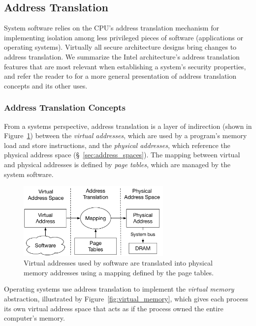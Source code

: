 \subsection{Address Translation}
\label{sec:paging}


System software relies on the CPU's address translation mechanism for
implementing isolation among less privileged pieces of software (applications
or operating systems). Virtually all secure architecture designs bring changes
to address translation. We summarize the Intel architecture's address
translation features that are most relevant when establishing a system's
security properties, and refer the reader to \cite{jacob1998virtual} for a more
general presentation of address translation concepts and its other uses.


\subsubsection{Address Translation Concepts}

From a systems perspective, address translation is a layer of indirection
(shown in Figure~\ref{fig:address_translation}) between the
\textit{virtual addresses}, which are used by a program's memory load and store
instructions, and the \textit{physical addresses}, which reference the physical
address space (\S~\ref{sec:address_spaces}). The mapping between virtual and
physical addresses is defined by \textit{page tables}, which are managed by the
system software.

\begin{figure}[hbt]
  \centering
  \includegraphics[width=75mm]{figures/address_translation.pdf}
  \caption{
    Virtual addresses used by software are translated into physical memory
    addresses using a mapping defined by the page tables.
  }
  \label{fig:address_translation}
\end{figure}

Operating systems use address translation to implement the \textit{virtual
memory} abstraction, illustrated by Figure~\ref{fig:virtual_memory}, which
gives each process its own virtual address space that acts as if the process
owned the entire computer's memory.

